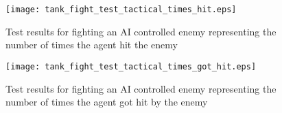 \begin{figure}
    \begin{center}
        \texttt{[image: tank\_fight\_test\_tactical\_times\_hit.eps]}
        \caption{Test results for fighting an AI controlled enemy representing the number of times the agent hit the enemy}
        \label{test_results_tank_fight_tactical_times_hit_bar_chart}
    \end{center}
\end{figure}

\begin{figure}
    \begin{center}
        \texttt{[image: tank\_fight\_test\_tactical\_times\_got\_hit.eps]}
        \caption{Test results for fighting an AI controlled enemy representing the number of times the agent got hit by the enemy}
        \label{test_results_tank_fight_tactical_times_got_hit_bar_chart}
    \end{center}
\end{figure}